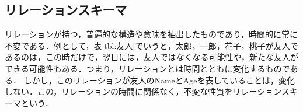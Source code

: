 \documentclass[a4paper,10pt]{jreport}
\begin{document}
\subsection{リレーションスキーマ}
リレーションが持つ，普遍的な構造や意味を抽出したものであり，時間的に常に不変である．例として，表\ref{tbl:友人}でいうと，太郎，一郎，花子，桃子が友人であるのは，この時だけで，翌日には，友人ではなくなる可能性や，新たな友人ができる可能性もある．つまり，リレーションとは時間とともに変化するものである．
しかし，このリレーションが友人のNameとAgeを表していることは，変化しない．この，リレーションの時間に関係なく，不変な性質をリレーションスキーマという．



\end{document}
